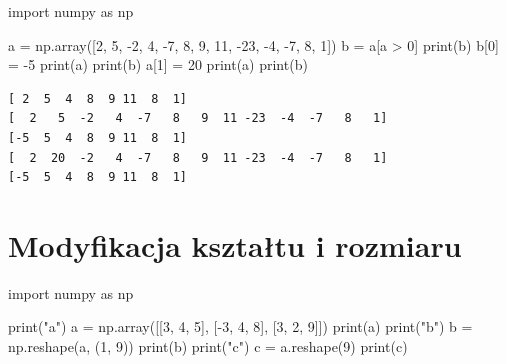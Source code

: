 \documentclass[
  polish,
  letterpaper,
  DIV=11,
  numbers=noendperiod]{scrreprt}
\newenvironment{Shaded}{\begin{snugshade}}{\end{snugshade}}
\newcommand{\BuiltInTok}[1]{\textcolor[rgb]{0.00,0.23,0.31}{#1}}
\newcommand{\DecValTok}[1]{\textcolor[rgb]{0.68,0.00,0.00}{#1}}
\newcommand{\ImportTok}[1]{\textcolor[rgb]{0.00,0.46,0.62}{#1}}
\newcommand{\NormalTok}[1]{\textcolor[rgb]{0.00,0.23,0.31}{#1}}
\newcommand{\OperatorTok}[1]{\textcolor[rgb]{0.37,0.37,0.37}{#1}}
\newcommand{\StringTok}[1]{\textcolor[rgb]{0.13,0.47,0.30}{#1}}
\begin{document}
\begin{Shaded}
\begin{Highlighting}[]
\ImportTok{import}\NormalTok{ numpy }\ImportTok{as}\NormalTok{ np}

\NormalTok{a }\OperatorTok{=}\NormalTok{ np.array([}\DecValTok{2}\NormalTok{, }\DecValTok{5}\NormalTok{, }\OperatorTok{{-}}\DecValTok{2}\NormalTok{, }\DecValTok{4}\NormalTok{, }\OperatorTok{{-}}\DecValTok{7}\NormalTok{, }\DecValTok{8}\NormalTok{, }\DecValTok{9}\NormalTok{, }\DecValTok{11}\NormalTok{, }\OperatorTok{{-}}\DecValTok{23}\NormalTok{, }\OperatorTok{{-}}\DecValTok{4}\NormalTok{, }\OperatorTok{{-}}\DecValTok{7}\NormalTok{, }\DecValTok{8}\NormalTok{, }\DecValTok{1}\NormalTok{])}
\NormalTok{b }\OperatorTok{=}\NormalTok{ a[a }\OperatorTok{\textgreater{}} \DecValTok{0}\NormalTok{]}
\BuiltInTok{print}\NormalTok{(b)}
\NormalTok{b[}\DecValTok{0}\NormalTok{] }\OperatorTok{=} \OperatorTok{{-}}\DecValTok{5}
\BuiltInTok{print}\NormalTok{(a)}
\BuiltInTok{print}\NormalTok{(b)}
\NormalTok{a[}\DecValTok{1}\NormalTok{] }\OperatorTok{=} \DecValTok{20}
\BuiltInTok{print}\NormalTok{(a)}
\BuiltInTok{print}\NormalTok{(b)}
\end{Highlighting}
\end{Shaded}

\begin{verbatim}
[ 2  5  4  8  9 11  8  1]
[  2   5  -2   4  -7   8   9  11 -23  -4  -7   8   1]
[-5  5  4  8  9 11  8  1]
[  2  20  -2   4  -7   8   9  11 -23  -4  -7   8   1]
[-5  5  4  8  9 11  8  1]
\end{verbatim}

\chapter{Modyfikacja kształtu i
rozmiaru}\label{modyfikacja-ksztaux142tu-i-rozmiaru}

\begin{Shaded}
\begin{Highlighting}[]
\ImportTok{import}\NormalTok{ numpy }\ImportTok{as}\NormalTok{ np}

\BuiltInTok{print}\NormalTok{(}\StringTok{"a"}\NormalTok{)}
\NormalTok{a }\OperatorTok{=}\NormalTok{ np.array([[}\DecValTok{3}\NormalTok{, }\DecValTok{4}\NormalTok{, }\DecValTok{5}\NormalTok{], [}\OperatorTok{{-}}\DecValTok{3}\NormalTok{, }\DecValTok{4}\NormalTok{, }\DecValTok{8}\NormalTok{], [}\DecValTok{3}\NormalTok{, }\DecValTok{2}\NormalTok{, }\DecValTok{9}\NormalTok{]])}
\BuiltInTok{print}\NormalTok{(a)}
\BuiltInTok{print}\NormalTok{(}\StringTok{"b"}\NormalTok{)}
\NormalTok{b }\OperatorTok{=}\NormalTok{ np.reshape(a, (}\DecValTok{1}\NormalTok{, }\DecValTok{9}\NormalTok{))}
\BuiltInTok{print}\NormalTok{(b)}
\BuiltInTok{print}\NormalTok{(}\StringTok{"c"}\NormalTok{)}
\NormalTok{c }\OperatorTok{=}\NormalTok{ a.reshape(}\DecValTok{9}\NormalTok{)}
\BuiltInTok{print}\NormalTok{(c)}
\end{Highlighting}
\end{Shaded}
\end{document}
